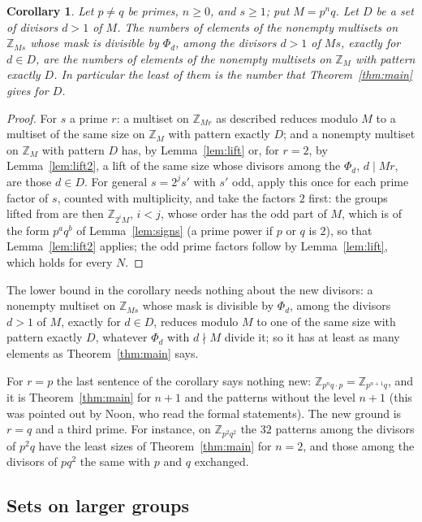 \documentclass[11pt,a4paper]{amsart}
\newtheorem{corollary}[theorem]{Corollary}
\theoremstyle{definition}
\theoremstyle{remark}
\newcommand{\Z}{\mathbb{Z}}
\begin{document}
\begin{corollary}\label{cor:lift}
Let $p\ne q$ be primes, $n\ge0$, and $s\ge1$; put $M=p^nq$. Let $D$ be a set of divisors $d>1$ of $M$. The numbers of
elements of the nonempty multisets on $\Z_{Ms}$ whose mask is divisible by $\Phi_d$, among the divisors $d>1$ of
$Ms$, exactly for $d\in D$, are the numbers of elements of the nonempty multisets on $\Z_M$ with pattern exactly
$D$. In particular the least of them is the number that Theorem~\ref{thm:main} gives for $D$.
\end{corollary}
\begin{proof}
For $s$ a prime $r$: a multiset on $\Z_{Mr}$ as described reduces modulo $M$ to a multiset of the same
size on $\Z_M$ with pattern exactly $D$; and a nonempty multiset on $\Z_M$ with pattern $D$ has, by
Lemma~\ref{lem:lift} or, for $r=2$, by Lemma~\ref{lem:lift2}, a lift of the same size whose divisors among the $\Phi_d$, $d\mid Mr$, are
those $d\in D$. For general $s=2^js'$ with $s'$ odd, apply this once for each prime factor of $s$, counted with
multiplicity, and take the factors $2$ first: the groups lifted from are then $\Z_{2^iM}$, $i<j$, whose order has the
odd part of $M$, which is of the form $p^aq^b$ of Lemma~\ref{lem:signs} (a prime power if $p$ or $q$ is $2$), so that
Lemma~\ref{lem:lift2} applies; the odd prime factors follow by Lemma~\ref{lem:lift}, which holds for every $N$.
\end{proof}

The lower bound in the corollary needs nothing about the new divisors: a nonempty multiset on $\Z_{Ms}$ whose mask is
divisible by $\Phi_d$, among the divisors $d>1$ of $M$, exactly for $d\in D$, reduces modulo $M$ to one of the same
size with pattern exactly $D$, whatever $\Phi_d$ with $d\nmid M$ divide it; so it has at least as many elements as
Theorem~\ref{thm:main} says.

For $r=p$ the last sentence of the corollary says nothing new: $\Z_{p^nq\cdot p}=\Z_{p^{n+1}q}$, and it is Theorem~\ref{thm:main} for $n+1$ and the patterns
without the level $n+1$ (this was pointed out by Noon, who read the formal statements). The new ground is $r=q$ and a third prime.
For instance, on $\Z_{p^2q^2}$ the $32$ patterns among the divisors of $p^2q$ have the least sizes of
Theorem~\ref{thm:main} for $n=2$, and those among the divisors of $pq^2$ the same with $p$ and $q$ exchanged.

\subsection*{Sets on larger groups}
\end{document}
